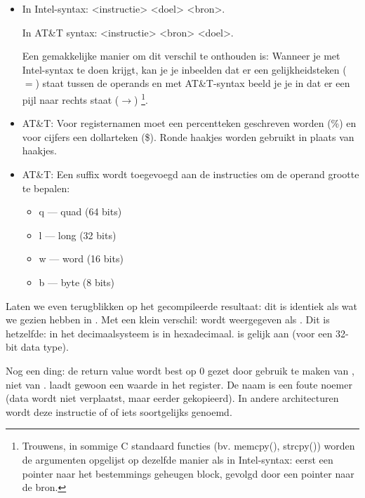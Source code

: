\begin{itemize}

\item
\NLph{}

In Intel-syntax: <instructie> <doel> <bron>.

In AT\&T syntax: <instructie> <bron> <doel>.

Een gemakkelijke manier om dit verschil te onthouden is: 
Wanneer je met Intel-syntax te doen krijgt, kan je je inbeelden dat er een gelijkheidsteken ($=$) staat tussen de operands
en met AT\&T-syntax beeld je je in dat er een pijl naar rechts staat ($\rightarrow$)
\footnote{Trouwens, in sommige C standaard functies (bv. memcpy(), strcpy()) worden
de argumenten opgelijst op dezelfde manier als in Intel-syntax: eerst een pointer naar het bestemmings geheugen block, 
gevolgd door een pointer naar de bron.}.

\item
AT\&T: Voor registernamen moet een percentteken geschreven worden (\%) en voor cijfers een dollarteken (\$).
Ronde haakjes worden gebruikt in plaats van haakjes.

\item
AT\&T: Een suffix wordt toegevoegd aan de instructies om de operand grootte te bepalen:

\begin{itemize}
\item q --- quad (64 bits)
\item l --- long (32 bits)
\item w --- word (16 bits)
\item b --- byte (8 bits)
\end{itemize}

\end{itemize}

Laten we even terugblikken op het gecompileerde resultaat: dit is identiek als wat we gezien hebben in \IDA.
Met een klein verschil:  wordt weergegeven als .
Dit is hetzelfde:  in het decimaalsysteem is  in hexadecimaal.
 is gelijk aan  (voor een 32-bit data type).

Nog een ding: de return value wordt best op 0 gezet door gebruik te maken van \MOV, niet van \XOR.
\MOV laadt gewoon een waarde in het register.
De naam is een foute noemer (data wordt niet verplaatst, maar eerder gekopieerd). In andere architecturen wordt deze instructie  of  of iets soortgelijks genoemd.

